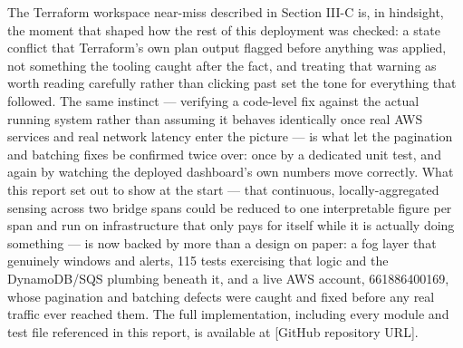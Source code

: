 \documentclass[conference]{IEEEtran}
\begin{document}
The Terraform workspace near-miss described in Section III-C is, in hindsight, the moment that shaped how the rest of this deployment was checked: a state conflict that Terraform's own plan output flagged before anything was applied, not something the tooling caught after the fact, and treating that warning as worth reading carefully rather than clicking past set the tone for everything that followed. The same instinct --- verifying a code-level fix against the actual running system rather than assuming it behaves identically once real AWS services and real network latency enter the picture --- is what let the pagination and batching fixes be confirmed twice over: once by a dedicated unit test, and again by watching the deployed dashboard's own numbers move correctly. What this report set out to show at the start --- that continuous, locally-aggregated sensing across two bridge spans could be reduced to one interpretable figure per span and run on infrastructure that only pays for itself while it is actually doing something --- is now backed by more than a design on paper: a fog layer that genuinely windows and alerts, 115 tests exercising that logic and the DynamoDB/SQS plumbing beneath it, and a live AWS account, 661886400169, whose pagination and batching defects were caught and fixed before any real traffic ever reached them. The full implementation, including every module and test file referenced in this report, is available at [GitHub repository URL].



\end{document}
